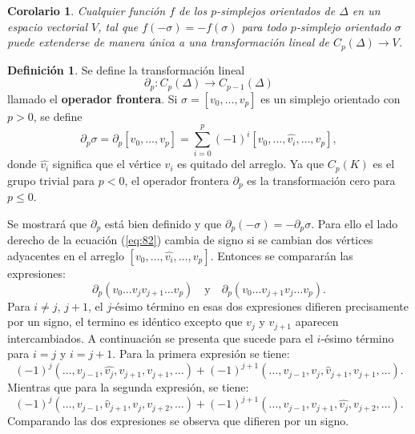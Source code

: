 \documentclass[12pt]{book}
\newtheorem{corollary}[theorem]{Corolario}
\theoremstyle{definition}
\newtheorem{definition}[theorem]{Definición}
\newcounter{in}
\newcounter{ini}
\begin{document}
\begin{corollary}
  \label{corf}
  Cualquier función $f$ de los $p$-simplejos orientados de $\Delta$ en
  un espacio vectorial $V$, tal que $f(- \sigma) = -f(\sigma)$ para
  todo $p$-simplejo orientado $\sigma$ puede extenderse de manera
  única a una transformación lineal de $C_{p}(\Delta) \to V$.
\end{corollary}

\begin{definition}
  \label{bo}
  Se define la transformación lineal
  \begin{equation}
    \label{eq:82}
    \partial_{p} \colon C_{p}(\Delta) \to C_{p-1}(\Delta)
  \end{equation}
  llamado el \textbf{operador frontera}. Si
  $\sigma = [v_{0}, \ldots, v_{p}]$ es un simplejo orientado con
  $p > 0 $, se define
  \begin{equation}
    \label{eq:83}
    \partial_{p} \sigma = \partial_{p} [v_{0}, \ldots, v_{p}] = \sum_{i=0}^{p} (-1)^{i} [v_{0}, \ldots,\hat{v_{i}},\ldots, v_{p}],
  \end{equation}
  donde $\hat{v_{i}}$ significa que el vértice $v_{i}$ es quitado del
  arreglo. Ya que $C_{p}(K)$ es el grupo trivial para $p < 0$, el
  operador frontera $\partial_{p}$ es la transformación cero para $p \leq 0$.
\end{definition}
Se mostrará que $\partial_{p}$ está bien definido y que
$\partial_{p}(-\sigma) = -\partial_{p}\sigma$. Para ello el lado
derecho de la ecuación (\ref{eq:82}) cambia de signo si se cambian dos vértices
adyacentes en el arreglo $[v_{0}, \ldots,\hat{v_{i}},\ldots,
v_{p}]$. Entonces se compararán las expresiones:
\begin{equation}
  \label{eq:84}
  \partial_{p}(v_{0}\ldots v_{j} v_{j+1} \ldots v_{p}) \quad \mathrm{y} \quad \partial_{p}(v_{0} \ldots v_{j+1} v_{j} \ldots v_{p}).
\end{equation}
Para $i \neq j$, $j + 1$, el $j$-ésimo término en esas dos expresiones
difieren precisamente por un signo, el termino es idéntico excepto que
$v_{j}$ y $v_{j+1}$ aparecen intercambiados. A continuación se
presenta que sucede para el $i$-ésimo término para $i = j$ y
$i = j+1$. Para la primera expresión se tiene:
\begin{equation}
  \label{eq:85}
    (-1)^{j} (\ldots,v_{j-1},\hat{v_{j}}, v_{j+1}, v_{j+1},\ldots)  + (-1)^{j+1} (\ldots,v_{j-1},v_{j},\hat{v}_{j+1}, v_{j+1},\ldots).
  \end{equation}
Mientras que para la segunda expresión, se tiene:
  \begin{equation}
    \label{eq:87}
    (-1)^{j} (\ldots,v_{j-1},\hat{v}_{j+1}, v_{j}, v_{j+2},\ldots)  + (-1)^{j+1} (\ldots,v_{j-1},v_{j+1},\hat{v_{j}}, v_{j+2},\ldots). 
  \end{equation}
  Comparando las dos expresiones se observa que difieren por un signo.
\end{document}
